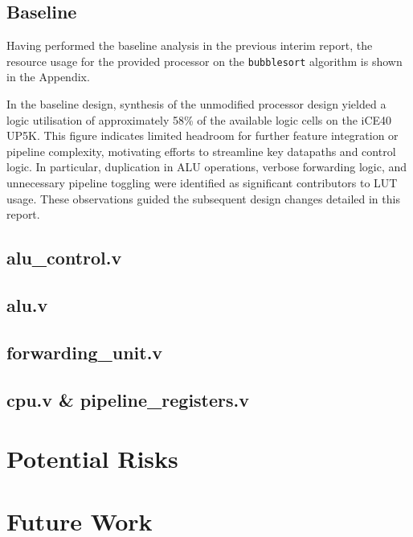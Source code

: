 \documentclass[a4paper,10pt]{article}
\begin{document}
\subsection{Baseline}
\label{sec:Baseline}

Having performed the baseline analysis in the previous interim report,
the resource usage for the provided processor on the \texttt{bubblesort}
algorithm is shown in the Appendix.

In the baseline design, 
synthesis of the unmodified processor design yielded 
a logic utilisation of approximately 
58\% of the available logic cells on the iCE40 UP5K. 
This figure indicates limited headroom for further feature 
integration or pipeline complexity, 
motivating efforts to streamline key datapaths and control logic. 
In particular, duplication in ALU operations, verbose forwarding logic, 
and unnecessary pipeline toggling were identified 
as significant contributors to LUT usage. 
These observations guided the subsequent design changes detailed in this report.

\subsection{alu\_control.v}
\label{sec:alu_control.v}

\subsection{alu.v}
\label{sec:alu.v}

\subsection{forwarding\_unit.v}
\label{sec:forwarding_unit.v}

\subsection{cpu.v \& pipeline\_registers.v}
\label{sec:cpu.v_and_pipeline_registers.v}

\section{Potential Risks}
\label{sec:Potential_Risks}

\section{Future Work}
\label{sec:Future_Work}
\end{document}
